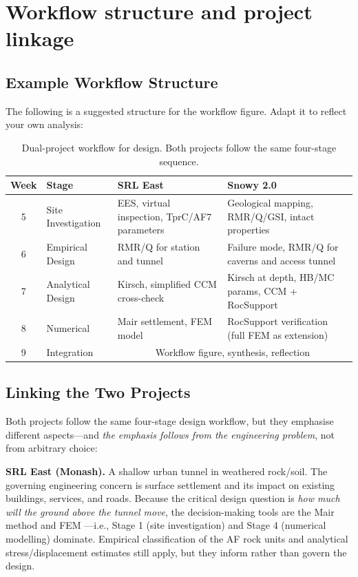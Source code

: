 \section{Workflow structure and project linkage}
\label{sec:workflow-structure-and-project-linkage}

\subsection{Example Workflow Structure}

The following is a suggested structure for the workflow figure. Adapt it to reflect your own analysis:

\begin{table}[h!]
\centering
\small
\begin{tabularx}{\textwidth}{c l X X}
\toprule
\textbf{Week} & \textbf{Stage} & \textbf{SRL East} & \textbf{Snowy 2.0} \\
\midrule
5 & Site Investigation & EES, virtual inspection, TprC/AF7 parameters & Geological mapping, RMR/Q/GSI, intact properties \\
6 & Empirical Design & RMR/Q for station and tunnel & Failure mode, RMR/Q for caverns and access tunnel \\
7 & Analytical Design & Kirsch, simplified CCM cross-check & Kirsch at depth, HB/MC params, CCM + RocSupport \\
8 & Numerical & Mair settlement, FEM model & RocSupport verification (full FEM as extension) \\
9 & Integration & \multicolumn{2}{c}{Workflow figure, synthesis, reflection} \\
\bottomrule
\end{tabularx}
\caption{Dual-project workflow for design. Both projects follow the same four-stage sequence.}
\end{table}

\subsection{Linking the Two Projects}

Both projects follow the same four-stage design workflow, but they emphasise different aspects---and \textit{the emphasis follows from the engineering problem}, not from arbitrary choice:

\textbf{SRL East (Monash).} A shallow urban tunnel in weathered rock/soil. The governing engineering concern is surface settlement and its impact on existing buildings, services, and roads. Because the critical design question is \textit{how much will the ground above the tunnel move}, the decision-making tools are the Mair method and FEM ---i.e., Stage 1 (site investigation) and Stage 4 (numerical modelling) dominate. Empirical classification of the AF rock units and analytical stress/displacement estimates still apply, but they inform rather than govern the design.

